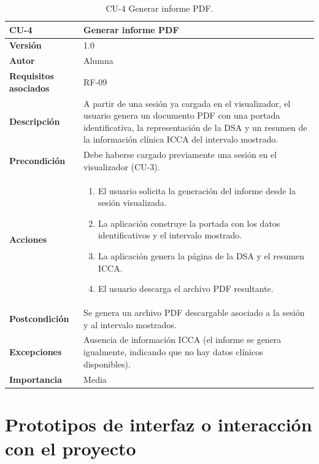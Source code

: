 \documentclass[
  spanish,
  a4paper,
  12pt,
  twoside]{memoir}
\providecommand{\tightlist}{%
  \setlength{\itemsep}{0pt}\setlength{\parskip}{0pt}}
\begin{document}
\begin{table}[p]
    \centering
    \begin{tabularx}{\linewidth}{ p{} p{} }
        \toprule
        \textbf{CU-4}    & \textbf{Generar informe PDF}\\
        \toprule
        \textbf{Versión}              & 1.0    \\
        \textbf{Autor}                & Alumna \\
        \textbf{Requisitos asociados} & RF-09 \\
        \textbf{Descripción}          & A partir de una sesión ya cargada en el visualizador, el usuario genera un documento PDF con una portada identificativa, la representación de la DSA y un resumen de la información clínica ICCA del intervalo mostrado. \\
        \textbf{Precondición}         & Debe haberse cargado previamente una sesión en el visualizador (CU-3). \\
        \textbf{Acciones}             &
        \begin{enumerate}
            \def\labelenumi{\arabic{enumi}.}
            \tightlist
            \item El usuario solicita la generación del informe desde la sesión visualizada.
            \item La aplicación construye la portada con los datos identificativos y el intervalo mostrado.
            \item La aplicación genera la página de la DSA y el resumen ICCA.
            \item El usuario descarga el archivo PDF resultante.
        \end{enumerate}\\
        \textbf{Postcondición}        & Se genera un archivo PDF descargable asociado a la sesión y al intervalo mostrados. \\
        \textbf{Excepciones}          & Ausencia de información ICCA (el informe se genera igualmente, indicando que no hay datos clínicos disponibles). \\
        \textbf{Importancia}          & Media \\
        \bottomrule
    \end{tabularx}
    \caption{CU-4 Generar informe PDF.}
\end{table}

\chapter{Prototipos de interfaz o interacción con el
proyecto}\label{prototipos-de-interfaz-o-interacciuxf3n-con-el-proyecto}
\end{document}
